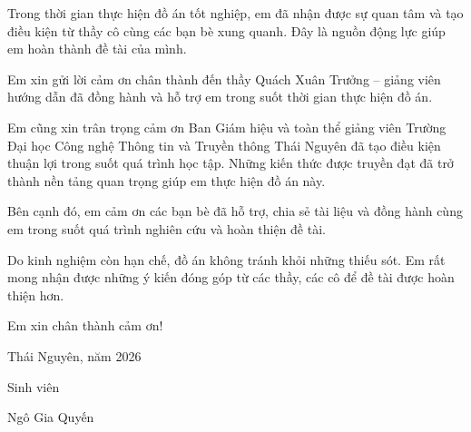 \documentclass[../main.tex]{subfiles}
\begin{document}
Trong thời gian thực hiện đồ án tốt nghiệp, em đã nhận được sự quan tâm và tạo điều kiện từ thầy cô cùng các bạn bè xung quanh. Đây là nguồn động lực giúp em hoàn thành đề tài của mình.

Em xin gửi lời cảm ơn chân thành đến thầy Quách Xuân Trưởng -- giảng viên hướng dẫn đã đồng hành và hỗ trợ em trong suốt thời gian thực hiện đồ án.

Em cũng xin trân trọng cảm ơn Ban Giám hiệu và toàn thể giảng viên Trường Đại học Công nghệ Thông tin và Truyền thông Thái Nguyên đã tạo điều kiện thuận lợi trong suốt quá trình học tập. Những kiến thức được truyền đạt đã trở thành nền tảng quan trọng giúp em thực hiện đồ án này.

Bên cạnh đó, em cảm ơn các bạn bè đã hỗ trợ, chia sẻ tài liệu và đồng hành cùng em trong suốt quá trình nghiên cứu và hoàn thiện đề tài.

Do kinh nghiệm còn hạn chế, đồ án không tránh khỏi những thiếu sót. Em rất mong nhận được những ý kiến đóng góp từ các thầy, các cô để đề tài được hoàn thiện hơn.

Em xin chân thành cảm ơn!

\vspace{1cm}

\begin{flushright}
Thái Nguyên, năm 2026

Sinh viên

\vspace{2cm}

Ngô Gia Quyến
\end{flushright}
\end{document}
